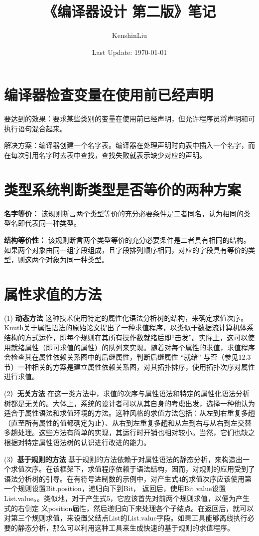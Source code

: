 \documentclass[12pt]{article}
\title{《编译器设计 第二版》笔记}
\author{KenshinLiu}
\date{Last Update: \today}                                           %
\begin{document}
\maketitle

\newpage

\section*{编译器检查变量在使用前已经声明}

要达到的效果：要求某些类别的变量在使用前已经声明，但允许程序员将声明和可执行语句混合起来。

解决方案：编译器创建一个名字表。编译器在处理声明时向表中插入一个名字，而在每次引用名字时去表中查找，查找失败就表示缺少对应的声明。


\section*{类型系统判断类型是否等价的两种方案}

\textbf{名字等价：} 该规则断言两个类型等价的充分必要条件是二者同名，认为相同的类型名即代表同一种类型。

\textbf{结构等价性：} 该规则断言两个类型等价的充分必要条件是二者具有相同的结构。如果两个对象由同一组字段组成，且字段排列顺序相同，对应的字段具有等价的类型，则这两个对象为同一种类型。

\section*{属性求值的方法}

(1) \textbf{动态方法} 这种技术使用特定的属性化语法分析树的结构，来确定求值次序。Knuth关于属性语法的原始论文提出了一种求值程序，以类似于数据流计算机体系结构的方式运作，即每个规则在其所有操作数就绪后即“击发”。实际上，这可以使用就绪属性（即可求值的属性）的队列来实现。随着对每个属性的求值，求值程序会检查其在属性依赖关系图中的后继属性，判断后继属性 “就绪” 与否（参见12.3节）一种相关的方案是建立属性依赖关系图，对其拓扑排序，使用拓扑次序对属性进行求值。

(2）\textbf{无关方法} 在这一类方法中，求值的次序与属性语法和特定的属性化语法分析树都是无关的。大体上，系统的设计者可以从其自身的考虑出发，选择一种他认为适合于属性语法和求值环境的方法。这种风格的求值方法包括：从左到右重复多趟（直至所有属性的值都确定为止）、从右到左重复多趟和从左到右与从右到左交替多趟处理。这些方法有简单的实现，其运行时开销也相对较小。当然，它们也缺之根据对特定属性语法树的认识进行改进的能力。

(3）\textbf{基于规则的方法} 基于规则的方法依赖于对属性语法的静态分析，来构造出一个求值次序。在该框架下，求值程序依赖于语法结构，因而，对规则的应用受到了语法分析树的引导。在有符号进制数的示例中，对产生式4的求值次序应该使用第一个规则设置Bit.position，递归向下到Bit， 返回后，使用Bit value设置List.value。。类似地，对于产生式5，它应该首先对前两个规则求值，以便为产生式的右侧定 义position屆性，然后递归向下来处理各个子结点。在返回后，就可以对第三个规则求值，来设置父结点List的List.value字段。如果工具能够离线执行必要的静态分析，那么可以利用这种工具来生成快速的基于规则的求值程序。
\end{document}

